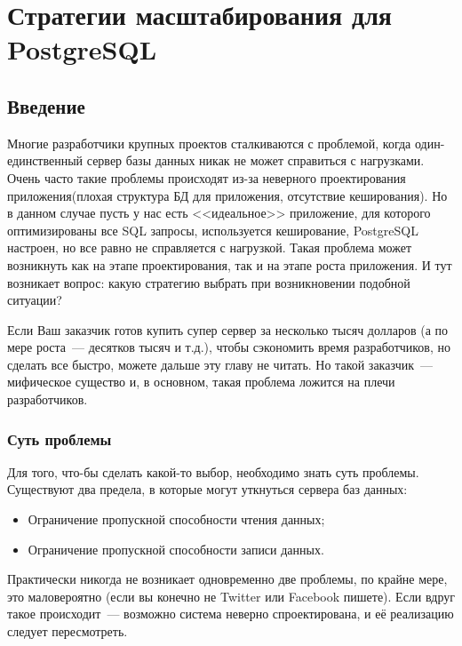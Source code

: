 \chapter{Стратегии масштабирования для PostgreSQL}

\begin{epigraphs}
\end{epigraphs}

\section{Введение}
Многие разработчики крупных проектов сталкиваются с проблемой, когда один-единственный сервер базы данных никак не может справиться с нагрузками. Очень часто такие проблемы происходят из-за неверного проектирования приложения(плохая структура БД для приложения, отсутствие кеширования). Но в данном случае пусть у нас есть <<идеальное>> приложение, для которого оптимизированы все SQL запросы, используется кеширование, PostgreSQL настроен, но все равно не справляется с нагрузкой. Такая проблема может возникнуть как на этапе проектирования, так и на этапе роста приложения. И тут возникает вопрос: какую стратегию выбрать при возникновении подобной ситуации?

Если Ваш заказчик готов купить супер сервер за несколько тысяч долларов (а по мере роста~--- десятков тысяч и т.д.), чтобы сэкономить время разработчиков, но сделать все быстро, можете дальше эту главу не читать. Но такой заказчик~--- мифическое существо и, в основном, такая проблема ложится на плечи разработчиков.

\subsection{Суть проблемы}

Для того, что-бы сделать какой-то выбор, необходимо знать суть проблемы. Существуют два предела, в которые могут уткнуться сервера баз данных:

\begin{itemize}
  \item Ограничение пропускной способности чтения данных;
  \item Ограничение пропускной способности записи данных.
\end{itemize}

Практически никогда не возникает одновременно две проблемы, по крайне мере, это маловероятно (если вы конечно не Twitter или Facebook пишете). Если вдруг такое происходит~--- возможно система неверно спроектирована, и её реализацию следует пересмотреть.

